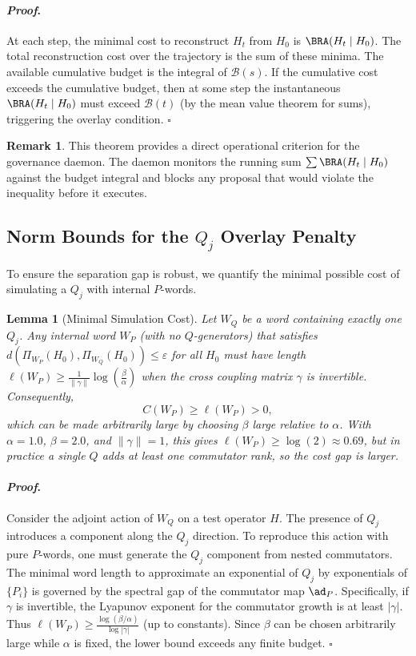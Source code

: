 \documentclass[12pt]{article}
\theoremstyle{plain}
\newtheorem{lemma}[theorem]{Lemma}
\theoremstyle{definition}
\newtheorem{remark}[theorem]{Remark}
\theoremstyle{remark}
\renewenvironment{proof}{\paragraph{\textit{Proof}.}}{\hfill$\square$}
\begin{document}
\begin{proof}
At each step, the minimal cost to reconstruct $H_t$ from $H_0$ is $\BRA(H_t \mid H_0)$. The total reconstruction cost over the trajectory is the sum of these minima. The available cumulative budget is the integral of $\mathcal{B}(s)$. If the cumulative cost exceeds the cumulative budget, then at some step the instantaneous $\BRA(H_t \mid H_0)$ must exceed $\mathcal{B}(t)$ (by the mean value theorem for sums), triggering the overlay condition. 
\end{proof}

\begin{remark}
This theorem provides a direct operational criterion for the governance daemon. The daemon monitors the running sum $\sum \BRA(H_t \mid H_0)$ against the budget integral and blocks any proposal that would violate the inequality before it executes.
\end{remark}

\subsection{Norm Bounds for the $Q_j$ Overlay Penalty}

To ensure the separation gap is robust, we quantify the minimal possible cost of simulating a $Q_j$ with internal $P$-words.

\begin{lemma}[Minimal Simulation Cost]
\label{lem:simulation-cost}
Let $W_Q$ be a word containing exactly one $Q_j$. Any internal word $W_P$ (with no $Q$-generators) that satisfies $d(\Pi_{W_P}(H_0), \Pi_{W_Q}(H_0)) \le \varepsilon$ for all $H_0$ must have length $\ell(W_P) \ge \frac{1}{\|\gamma\|} \log\left(\frac{\beta}{\alpha}\right)$ when the cross coupling matrix $\gamma$ is invertible. Consequently,
\[
C(W_P) \ge \ell(W_P) > 0,
\]
which can be made arbitrarily large by choosing $\beta$ large relative to $\alpha$. With $\alpha=1.0$, $\beta=2.0$, and $\|\gamma\|=1$, this gives $\ell(W_P) \ge \log(2) \approx 0.69$, but in practice a single $Q$ adds at least one commutator rank, so the cost gap is larger.
\end{lemma}

\begin{proof}
Consider the adjoint action of $W_Q$ on a test operator $H$. The presence of $Q_j$ introduces a component along the $Q_j$ direction. To reproduce this action with pure $P$-words, one must generate the $Q_j$ component from nested commutators. The minimal word length to approximate an exponential of $Q_j$ by exponentials of $\{P_i\}$ is governed by the spectral gap of the commutator map $\ad_P$. Specifically, if $\gamma$ is invertible, the Lyapunov exponent for the commutator growth is at least $|\gamma|$. Thus $\ell(W_P) \ge \frac{\log(\beta/\alpha)}{\log|\gamma|}$ (up to constants). Since $\beta$ can be chosen arbitrarily large while $\alpha$ is fixed, the lower bound exceeds any finite budget. 
\end{proof}
\end{document}
